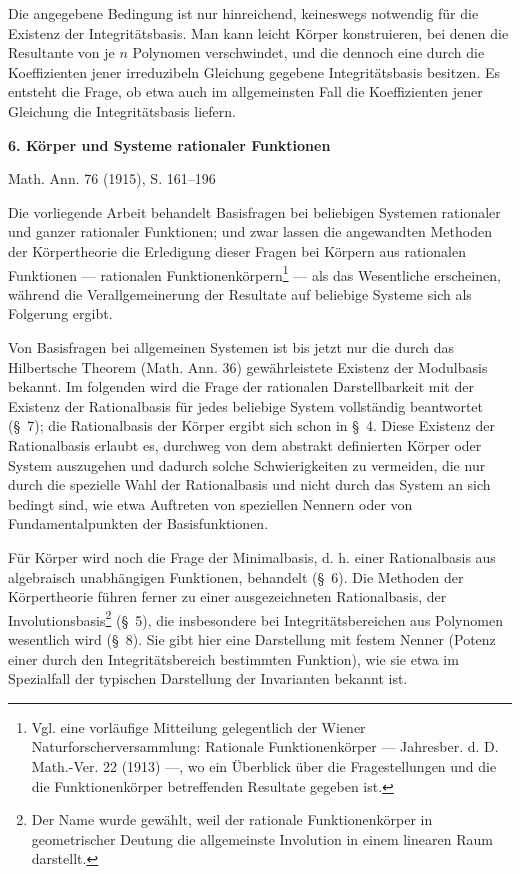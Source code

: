 \documentclass[11pt]{article}
\begin{document}
Die angegebene Bedingung ist nur hinreichend, keineswegs notwendig für die Existenz der Integritätsbasis. Man kann leicht Körper konstruieren, bei denen die Resultante von je $n$ Polynomen verschwindet, und die dennoch eine durch die Koeffizienten jener irreduzibeln Gleichung gegebene Integritätsbasis besitzen. Es entsteht die Frage, ob etwa auch im allgemeinsten Fall die Koeffizienten jener Gleichung die Integritätsbasis liefern.

\clearpage

\begin{center}
{\Large\bfseries 6. Körper und Systeme rationaler Funktionen}\par
\vspace{1.2em}
Math. Ann. 76 (1915), S. 161--196
\end{center}

\vspace{2em}

Die vorliegende Arbeit behandelt Basisfragen bei beliebigen Systemen rationaler und ganzer rationaler Funktionen; und zwar lassen die angewandten Methoden der Körpertheorie die Erledigung dieser Fragen bei Körpern aus rationalen Funktionen --- rationalen Funktionenkörpern\footnote{Vgl. eine vorläufige Mitteilung gelegentlich der Wiener Naturforscherversammlung: Rationale Funktionenkörper --- Jahresber. d. D. Math.-Ver. 22 (1913) ---, wo ein Überblick über die Fragestellungen und die die Funktionenkörper betreffenden Resultate gegeben ist.} --- als das Wesentliche erscheinen, während die Verallgemeinerung der Resultate auf beliebige Systeme sich als Folgerung ergibt.

Von Basisfragen bei allgemeinen Systemen ist bis jetzt nur die durch das Hilbertsche Theorem (Math. Ann. 36) gewährleistete Existenz der Modulbasis bekannt. Im folgenden wird die Frage der rationalen Darstellbarkeit mit der Existenz der Rationalbasis für jedes beliebige System vollständig beantwortet (\S\ 7); die Rationalbasis der Körper ergibt sich schon in \S\ 4. Diese Existenz der Rationalbasis erlaubt es, durchweg von dem abstrakt definierten Körper oder System auszugehen und dadurch solche Schwierigkeiten zu vermeiden, die nur durch die spezielle Wahl der Rationalbasis und nicht durch das System an sich bedingt sind, wie etwa Auftreten von speziellen Nennern oder von Fundamentalpunkten der Basisfunktionen.

Für Körper wird noch die Frage der Minimalbasis, d. h. einer Rationalbasis aus algebraisch unabhängigen Funktionen, behandelt (\S\ 6). Die Methoden der Körpertheorie führen ferner zu einer ausgezeichneten Rationalbasis, der Involutionsbasis\footnote{Der Name wurde gewählt, weil der rationale Funktionenkörper in geometrischer Deutung die allgemeinste Involution in einem linearen Raum darstellt.} (\S\ 5), die insbesondere bei Integritätsbereichen aus Polynomen wesentlich wird (\S\ 8). Sie gibt hier eine Darstellung mit festem Nenner (Potenz einer durch den Integritätsbereich bestimmten Funktion), wie sie etwa im Spezialfall der typischen Darstellung der Invarianten bekannt ist.
\end{document}
